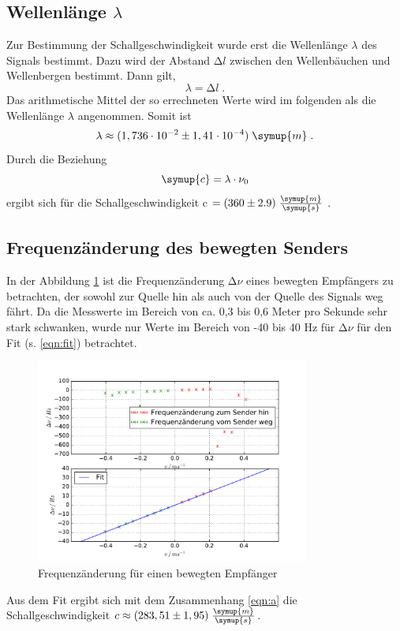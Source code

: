 \subsection{Wellenlänge \texorpdfstring{$\lambda$}{[math]}}
\label{sec:welll}
Zur Bestimmung der Schallgeschwindigkeit wurde erst die Wellenlänge $\lambda$ des Signals
bestimmt. Dazu wird der Abstand $\increment l$ zwischen den Wellenbäuchen und Wellenbergen
bestimmt. Dann gilt,
\begin{equation*}
  \lambda = \increment l \;.
\end{equation*}
Das arithmetische Mittel der so errechneten Werte wird im folgenden als die
Wellenlänge $\lambda$ angenommen. Somit ist
\begin{equation*}
  \lambda \approx (1,736\cdot 10^{-2} \pm 1,41\cdot10^{-4})\;\symup{m}\; .
\end{equation*}
Durch die Beziehung
\begin{equation*}
  \symup{c} = \lambda \cdot \nu_0
\end{equation*}
ergibt sich für die Schallgeschwindigkeit c $ = (360 \pm 2.9)\;
 \frac{\symup{m}}{\symup{s}}$ .
\subsection{Frequenzänderung des bewegten Senders}
\label{sec:fqs}
In der Abbildung \ref{fig:d} ist die Frequenzänderung $\increment \nu$ eines
bewegten Empfängers zu betrachten, der sowohl zur Quelle hin als auch von der
Quelle des Signals weg fährt. Da die Messwerte im Bereich von ca. 0,3 bis 0,6
Meter pro Sekunde sehr stark schwanken, wurde nur Werte im Bereich von -40 bis
40 Hz für $\increment \nu $ für den Fit (s. \eqref{eqn:fit}) betrachtet.
\begin{figure}
  \centering
  \includegraphics[width=0.8\textwidth]{plots/dplot.pdf}
  \caption{Frequenzänderung für einen bewegten Empfänger}
  \label{fig:d}
\end{figure}
Aus dem Fit ergibt sich mit dem Zusammenhang \eqref{eqn:a} die
Schallgeschwindigkeit $c \approx (283,51 \pm 1,95)\; \frac{\symup{m}}{\symup{s}}$.

